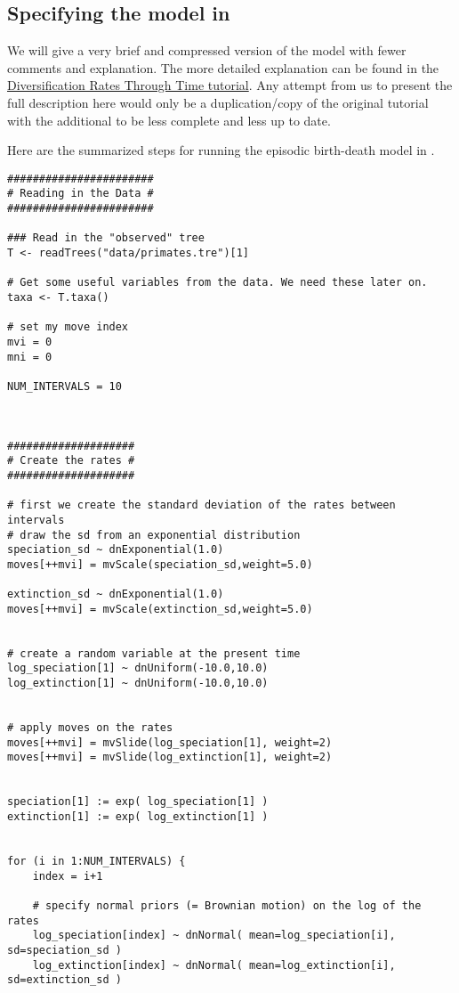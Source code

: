 \subsection{Specifying the model in \Rev}
We will give a very brief and compressed version of the model with fewer comments and explanation.
The more detailed explanation can be found in the \href{https://github.com/revbayes/revbayes_tutorial/raw/master/tutorial_TeX/RB_DiversificationRate_Episodic_Tutorial/RB_DiversificationRate_Episodic_Tutorial.pdf}{Diversification Rates Through Time tutorial}.
Any attempt from us to present the full description here would only be a duplication/copy of the original tutorial with the additional to be less complete and less up to date.


Here are the summarized steps for running the episodic birth-death model in \Rev.
{\tt \begin{snugshade*}
\begin{lstlisting}
#######################
# Reading in the Data #
#######################

### Read in the "observed" tree
T <- readTrees("data/primates.tre")[1]

# Get some useful variables from the data. We need these later on.
taxa <- T.taxa()

# set my move index
mvi = 0
mni = 0

NUM_INTERVALS = 10



####################
# Create the rates #
####################

# first we create the standard deviation of the rates between intervals
# draw the sd from an exponential distribution
speciation_sd ~ dnExponential(1.0)
moves[++mvi] = mvScale(speciation_sd,weight=5.0)

extinction_sd ~ dnExponential(1.0)
moves[++mvi] = mvScale(extinction_sd,weight=5.0)


# create a random variable at the present time
log_speciation[1] ~ dnUniform(-10.0,10.0)
log_extinction[1] ~ dnUniform(-10.0,10.0)


# apply moves on the rates
moves[++mvi] = mvSlide(log_speciation[1], weight=2)
moves[++mvi] = mvSlide(log_extinction[1], weight=2)


speciation[1] := exp( log_speciation[1] )
extinction[1] := exp( log_extinction[1] )


for (i in 1:NUM_INTERVALS) {
    index = i+1
    
    # specify normal priors (= Brownian motion) on the log of the rates
    log_speciation[index] ~ dnNormal( mean=log_speciation[i], sd=speciation_sd )
    log_extinction[index] ~ dnNormal( mean=log_extinction[i], sd=extinction_sd )


\end{lstlisting}
\end{snugshade*}}
